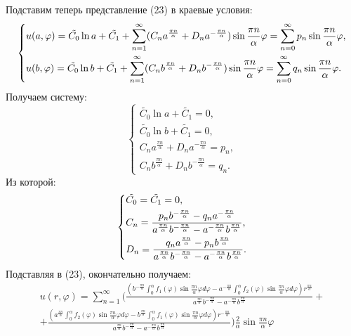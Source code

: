 \documentclass[11pt]{article}
\begin{document}
Подставим теперь представление (23) в краевые условия:
\begin{equation*}
\begin{dcases}
u(a, \varphi) = \tilde{C_0}\ln a + \tilde{C_1} + \sum_{n = 1}^{\infty}(C_na^{\frac{\pi n}\alpha} + D_na^{-\frac{\pi n}\alpha})\sin\frac{\pi n}\alpha\varphi
= \sum_{n = 0}^{\infty}p_n\sin\frac{\pi n}\alpha\varphi, \\
u(b, \varphi) = \tilde{C_0}\ln b + \tilde{C_1} + \sum_{n = 1}^{\infty}(C_nb^{\frac{\pi n}\alpha} + D_nb^{-\frac{\pi n}\alpha})\sin\frac{\pi n}\alpha\varphi
= \sum_{n = 0}^{\infty}q_n\sin\frac{\pi n}\alpha\varphi.
\end{dcases}
\end{equation*}
Получаем систему:
\begin{equation*}
\begin{cases}
\tilde{C_0}\ln a + \tilde{C_1} = 0, \\
\tilde{C_0}\ln b + \tilde{C_1} = 0, \\
C_na^{\frac{\pi n}\alpha} + D_na^{-\frac{\pi n}\alpha} = p_n, \\
C_nb^{\frac{\pi n}\alpha} + D_nb^{-\frac{\pi n}\alpha} = q_n.
\end{cases}
\end{equation*}
Из которой:
\begin{equation*}
\begin{dcases}
\tilde{C_0} = \tilde{C_1} = 0, \\
C_n = \frac{p_nb^{-\frac{\pi n}\alpha} - q_na^{-\frac{\pi n}\alpha}}{a^{\frac{\pi n}\alpha}b^{-\frac{\pi n}\alpha} - a^{-\frac{\pi n}\alpha}b^{\frac{\pi n}\alpha}}, \\
D_n = \frac{q_na^{\frac{\pi n}\alpha} - p_nb^{\frac{\pi n}\alpha}}{a^{\frac{\pi n}\alpha}b^{-\frac{\pi n}\alpha} - a^{-\frac{\pi n}\alpha}b^{\frac{\pi n}\alpha}}.
\end{dcases}
\end{equation*}
Подставляя в (23), окончательно получаем:
\begin{multline}
u(r, \varphi) = \sum_{n = 1}^{\infty}(\frac{(b^{-\frac{\pi n}\alpha}\int_0^{\alpha}f_1(\varphi)\sin\frac{\pi n}\alpha\varphi d\varphi -
a^{-\frac{\pi n}\alpha}\int_0^\alpha f_2(\varphi)\sin\frac{\pi n}\alpha\varphi d\varphi)r^{\frac{\pi n}\alpha}}{{a^{\frac{\pi n}\alpha}}b^{-\frac{\pi n}\alpha} - a^{-\frac{\pi n}\alpha}b^{\frac{\pi n}\alpha}} + \\
+ \frac{(a^{\frac{\pi n}\alpha}\int_0^{\alpha}f_2(\varphi)\sin\frac{\pi n}\alpha\varphi d\varphi
- b^{\frac{\pi n}\alpha}\int_0^{\alpha}f_1(\varphi)\sin\frac{\pi n}\alpha\varphi d\varphi
)r^{-\frac{\pi n}\alpha}}{a^{\frac{\pi n}\alpha}b^{-\frac{\pi n}\alpha} - a^{-\frac{\pi n}\alpha}b^{\frac{\pi n}\alpha}}
)\frac2\alpha\sin\frac{\pi n}\alpha\varphi
\end{multline}
\end{document}
